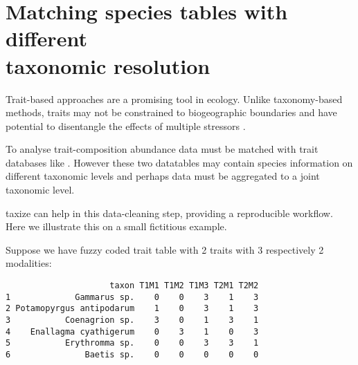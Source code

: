 
\section[Matching species tables]{\texorpdfstring{Matching species tables with different\\taxonomic resolution}{Matching species tables with different taxonomic resolution}} 
\label{ap:taxize:two} 

Trait-based approaches are a promising tool in ecology. Unlike taxonomy-based methods, traits may not be constrained to biogeographic boundaries \citep{baird_toward_2011} and have potential to disentangle the effects of multiple stressors \citep{statzner_can_2010}. 

To analyse trait-composition abundance data must be matched with trait data\-bases like \citep{usseglio-polatera_biological_2000}. However these two datatables may contain species information on different taxonomic levels and perhaps data must be aggregated to a joint taxonomic level.

taxize can help in this data-cleaning step, providing a reproducible workflow. Here we illustrate this on a small fictitious example.

Suppose we have fuzzy coded trait table with 2 traits with 3 respectively 2 modalities:

\begin{knitrout}
\color{fgcolor}\small\begin{kframe}
\begin{alltt}
 \hlkwb{<-} \hlstd{(} \hlstd{=} \hlstd{,}  \hlstd{=} \hlstd{,} \hlstd{=}\hlstd{,}
                       \hlstd{=} \hlstd{))}
\end{alltt}
\begin{verbatim}
                     taxon T1M1 T1M2 T1M3 T2M1 T2M2
1             Gammarus sp.    0    0    3    1    3
2 Potamopyrgus antipodarum    1    0    3    1    3
3           Coenagrion sp.    3    0    1    3    1
4    Enallagma cyathigerum    0    3    1    0    3
5           Erythromma sp.    0    0    3    3    1
6               Baetis sp.    0    0    0    0    0
\end{verbatim}
\end{kframe}
\end{knitrout}


